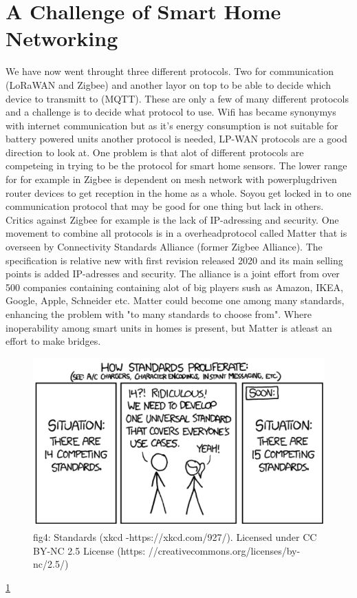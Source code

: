 \documentclass[article,a4paper]{IEEEtran}
\begin{document}
    \section{A Challenge of Smart Home Networking}
    We have now went throught three different protocols. Two for communication (LoRaWAN and Zigbee) and another layor on top to be able to decide which device to transmitt to (MQTT). These are only a few of many different protocols and a challenge is to decide what protocol to use. Wifi has became synonymys with internet communication but as it's energy consumption is not suitable for battery powered units another protocol is needed, LP-WAN protocols are a good direction to look at. One problem is that alot of different protocols are competeing in trying to be the protocol for smart home sensors. The lower range for for example in Zigbee is dependent on mesh network with powerplugdriven router devices to get reception in the home as a whole. Soyou get locked in to one communication protocol that may be good for one thing but lack in others. Critics against Zigbee for example is the lack of IP-adressing and security. One movement to combine all protocols is in a overheadprotocol called Matter \cite{Matterspec} that is overseen by Connectivity Standards Alliance (former Zigbee Alliance). The specification is relative new with first revision released 2020 and its main selling points is added IP-adresses and security. The alliance is a joint effort from over 500 companies containing containing alot of big players sush as Amazon, IKEA, Google, Apple, Schneider etc. Matter could become one among many standards, enhancing the problem with "to many standards to choose from". Where inoperability among smart units in homes is present, but Matter is atleast an effort to make bridges.  
    \begin{figure}
        \includegraphics[width=\columnwidth]{NewStandard.png} 
        \caption{ fig4: Standards (xkcd -https://xkcd.com/927/). Licensed under CC BY-NC 2.5 License (https: //creativecommons.org/licenses/by-nc/2.5/) }
        \label{fig4: Standards (xkcd -https://xkcd.com/927/). Licensed under CC BY-NC 2.5 License (https: //creativecommons.org/licenses/by-nc/2.5/)}   
    \end{figure}
    \ref{fig4: Standards (xkcd -https://xkcd.com/927/). Licensed under CC BY-NC 2.5 License (https: //creativecommons.org/licenses/by-nc/2.5/)} 
\end{document}
